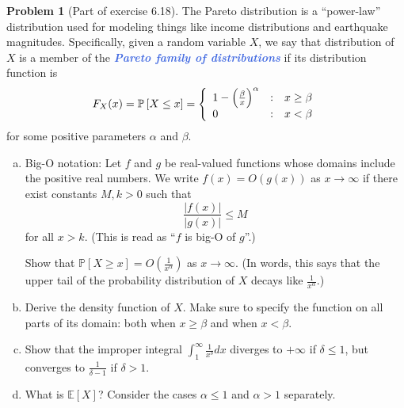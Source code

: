 \documentclass[10pt]{article}
\theoremstyle{definition}
\newtheorem{problem}[theorem]{Problem}
\newcommand{\1}[1]{\textbf{1}_{\left[#1\right]}} %
\def\E{\mathbb{E}} %
\def\P{\mathbb{P}} %
\newcommand{\demph}[1]{\textcolor{RoyalBlue}{\textbf{\slshape #1}}} %
\begin{document}
\begin{problem}[Part of exercise 6.18]
  The Pareto distribution is a ``power-law'' distribution used for modeling
  things like income distributions and earthquake magnitudes. Specifically,
  given a random variable $X$, we say that distribution of $X$ is a member of
  the \demph{Pareto family of distributions} if its distribution function is
  \begin{equation}\label{eq:2}
    F_{X}(x) = \P\left[X \leq x \right] 
    = \left\{ 
      \begin{array}{l@{\quad:\quad}l}
        1-\left( \frac{\beta}{x} \right)^{\alpha} & x \geq \beta\\
        0 & x<\beta
      \end{array}\right.
  \end{equation}
  for some positive parameters $\alpha$ and $\beta$.
  \begin{enumerate}[(a)]
    \item Big-O notation: Let $f$ and $g$ be real-valued functions whose
    domains include the positive real numbers. We write $f(x) =O(g(x))$ as
    $x \to \infty$ if there exist constants $M,k>0$ such that
    \begin{equation*}
      \frac{|f(x)|}{|g(x)|} \leq M
    \end{equation*}
    for all $x>k$. (This is read as ``$f$ is big-O of $g$''.)

    Show that $\P\left[X \geq x\right] = O(\frac{1}{x^{\alpha}})$ as
    $x \to \infty$. (In words, this says that the upper tail of the
    probability distribution of $X$ decays like $\frac{1}{x^{\alpha}}$.)
    
    \item Derive the density function of $X$. Make sure to specify the
    function on all parts of its domain: both when $x \geq \beta$ and when
    $x<\beta$.
    \item Show that the improper integral
    $\int_{1}^{\infty}\frac{1}{x^{\delta}}dx$ diverges to $+\infty$ if
    $\delta \leq 1$, but converges to $\frac{1}{\delta-1}$ if $\delta>1$.
    \item What is $\E\left[X \right]$? Consider the cases $\alpha \leq 1$ and
    $\alpha > 1$ separately.
  \end{enumerate}

\end{problem}
\end{document}
